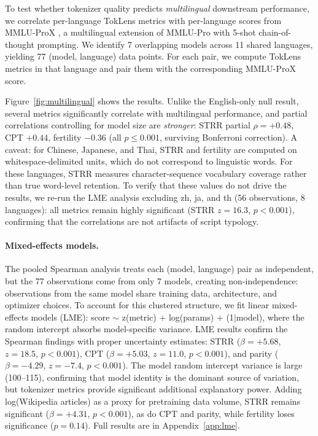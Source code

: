\documentclass[11pt]{article}
\begin{document}
To test whether tokenizer quality predicts \emph{multilingual} downstream performance, we correlate per-language TokLens metrics with per-language scores from MMLU-ProX \citep{li2025mmluprox}, a multilingual extension of MMLU-Pro with 5-shot chain-of-thought prompting. We identify 7 overlapping models across 11 shared languages, yielding 77 (model, language) data points. For each pair, we compute TokLens metrics in that language and pair them with the corresponding MMLU-ProX score.

Figure~\ref{fig:multilingual} shows the results. Unlike the English-only null result, several metrics significantly correlate with multilingual performance, and partial correlations controlling for model size are \emph{stronger}: STRR partial $\rho = +0.48$, CPT $+0.44$, fertility $-0.36$ (all $p \leq 0.001$, surviving Bonferroni correction). A caveat: for Chinese, Japanese, and Thai, STRR and fertility are computed on whitespace-delimited units, which do not correspond to linguistic words. For these languages, STRR measures character-sequence vocabulary coverage rather than true word-level retention. To verify that these values do not drive the results, we re-run the LME analysis excluding zh, ja, and th (56 observations, 8 languages): all metrics remain highly significant (STRR $z = 16.3$, $p < 0.001$), confirming that the correlations are not artifacts of script typology.

\paragraph{Mixed-effects models.} The pooled Spearman analysis treats each (model, language) pair as independent, but the 77 observations come from only 7 models, creating non-independence: observations from the same model share training data, architecture, and optimizer choices. To account for this clustered structure, we fit linear mixed-effects models (LME): score $\sim$ z(metric) + log(params) + (1$|$model), where the random intercept absorbs model-specific variance. LME results confirm the Spearman findings with proper uncertainty estimates: STRR ($\beta = +5.68$, $z = 18.5$, $p < 0.001$), CPT ($\beta = +5.03$, $z = 11.0$, $p < 0.001$), and parity ($\beta = -4.29$, $z = -7.4$, $p < 0.001$). The model random intercept variance is large (100--115), confirming that model identity is the dominant source of variation, but tokenizer metrics provide significant additional explanatory power. Adding log(Wikipedia articles) as a proxy for pretraining data volume, STRR remains significant ($\beta = +4.31$, $p < 0.001$), as do CPT and parity, while fertility loses significance ($p = 0.14$). Full results are in Appendix~\ref{app:lme}.
\end{document}
